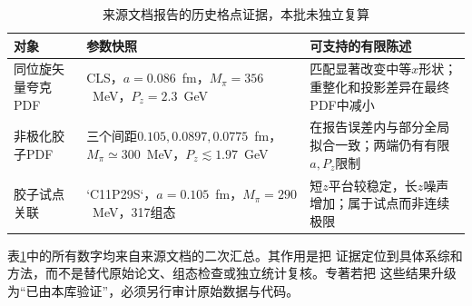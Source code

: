 \begin{table}[htbp]
  \centering
  \small
  \caption{来源文档报告的历史格点证据，本批未独立复算}
  \label{tab:b04-lattice-evidence}
  \begin{tabularx}{\textwidth}{@{}lXX@{}}
    \toprule
    对象 & 参数快照 & 可支持的有限陈述 \\
    \midrule
    同位旋矢量夸克PDF & CLS，$a=0.086$~fm，$M_\pi=356$~MeV，$P_z=2.3$~GeV & 匹配显著改变中等$x$形状；重整化和投影差异在最终PDF中减小 \\
    非极化胶子PDF & 三个间距$0.105,0.0897,0.0775$~fm，$M_\pi\simeq300$~MeV，$P_z\lesssim1.97$~GeV & 在报告误差内与部分全局拟合一致；两端仍有有限$a,P_z$限制 \\
    胶子试点关联 & `C11P29S`，$a=0.105$~fm，$M_\pi=290$~MeV，317组态 & 短$z$平台较稳定，长$z$噪声增加；属于试点而非连续极限 \\
    \bottomrule
  \end{tabularx}
\end{table}

表\ref{tab:b04-lattice-evidence}中的所有数字均来自来源文档的二次汇总。其作用是把
证据定位到具体系综和方法，而不是替代原始论文、组态检查或独立统计复核。专著若把
这些结果升级为“已由本库验证”，必须另行审计原始数据与代码。
